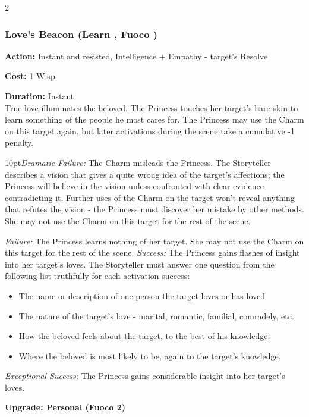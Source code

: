 \begin{multicols}{2}
\subsubsection*{Love's Beacon (Learn \textbullet\textbullet, Fuoco \textbullet)}

\noindent \textbf{Action:} Instant and resisted, Intelligence + Empathy - target's Resolve

\noindent \textbf{Cost:} 1 Wisp

\noindent \textbf{Duration:} Instant\\

\noindent True love illuminates the beloved. The Princess touches her target's bare skin to learn something of the people he most cares for. The Princess may use the Charm on this target again, but later activations during the scene take a cumulative -1 penalty.

\begin{myindentpar}{10pt}\emph{Dramatic Failure:} The Charm misleads the Princess. The Storyteller describes a vision that gives a quite wrong idea of the target's affections; the Princess will believe in the vision unless confronted with clear evidence contradicting it. Further uses of the Charm on the target won't reveal anything that refutes the vision - the Princess must discover her mistake by other methods. She may not use the Charm on this target for the rest of the scene.


\emph{Failure:} The Princess learns nothing of her target. She may not use the Charm on this target for the rest of the scene.
\emph{Success:} The Princess gains flashes of insight into her target's loves. The Storyteller must answer one question from the following list truthfully for each activation success:

\begin{itemize}
\item The name or description of one person the target loves or has loved
\item The nature of the target's love - marital, romantic, familial, comradely, etc.
\item How the beloved feels about the target, to the best of his knowledge.
\item Where the beloved is most likely to be, again to the target's knowledge.
\end{itemize}

\emph{Exceptional Success:} The Princess gains considerable insight into her target's loves.

\textbf{Upgrade: Personal (Fuoco 2)}


\end{myindentpar}
\end{multicols}
